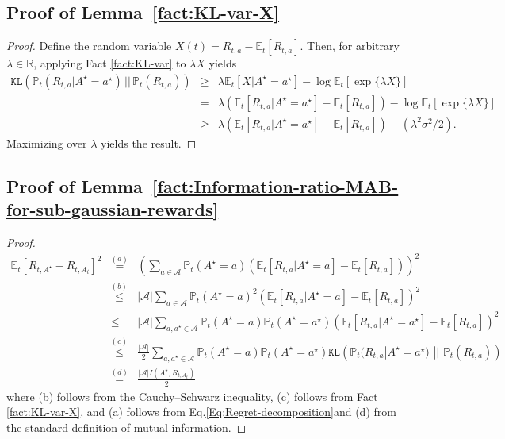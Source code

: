 \documentclass[10pt]{article}
\def\KL{\texttt{KL}}
\def\E{\mathbb{E}}
\newcommand{\A}{\mathcal{A}}
\newcommand{\Prob}{\mathbb{P}}
\begin{document}
\subsection{Proof of Lemma~\ref{fact:KL-var-X}}

\begin{proof}
Define the random variable $X(t)=R_{t,a}- \E_{t}\left[ R_{t,a}\right]$. Then, for arbitrary $\lambda \in \mathbb{R}$, applying Fact \ref{fact:KL-var} to $\lambda X$ yields
\begin{eqnarray*}
\KL \left(\Prob_{t}\left( R_{t,a}  | A^\star=a^\star \right) \, || \, \Prob_{t}( R_{t,a})\right) &\geq& \lambda \E_{t}\left[X | A^\star=a^\star \right] - \log \E_{t} \left[ \exp\{\lambda X \} \right]\\
&= & \lambda \left( \E_{t}[R_{t,a}| A^\star=a^\star]- \E_{t}\left[ R_{t,a}\right] \right)- \log \E_{t} \left[ \exp\{\lambda X \}\right] \\
&\geq&\lambda \left( \E_{t}[R_{t,a}| A^\star=a^\star]- \E_{t}\left[ R_{t,a}\right] \right) - (\lambda^2 \sigma^2 /2).
\end{eqnarray*}
Maximizing over $\lambda$ yields the result. 
\end{proof}

\subsection{Proof of Lemma~\ref{fact:Information-ratio-MAB-for-sub-gaussian-rewards}}

\begin{proof}   
\begin{eqnarray*}
\E_{t} \left[ R_{t,A^\star} - R_{t,A_{t}}\right]^2 &\overset{(a)}{=}&  \left(\sum_{a\in \A} \Prob_{t}(A^\star=a) \left( \E_{t}\left[R_{t,a} | A^\star=a \right] - \E_{t}[R_{t,a}]\right) \right)^2 \\
&\overset{(b)}{\leq}& |\A|  \sum_{a\in \A} \Prob_{t}(A^\star=a)^2 \left( \E_{t}\left[R_{t,a} | A^\star=a \right] - \E_{t}[ R_{t,a}]\right)^2    \\
&\leq& |\A|  \sum_{a, a^\star \in \A} \Prob_{t}(A^\star=a)\Prob_{t}(A^\star=a^\star) \left( \E_{t}\left[R_{t,a} | A^\star=a^\star \right] - \E_{t}[ R_{t,a}]\right)^2   \\
&\overset{(c)}{\leq}& \frac{|\A|}{2} \sum_{a, a^\star \in \A} \Prob_{t}(A^\star=a)\Prob_{t}(A^\star=a^\star){\KL}\left(\Prob_{t}(R_{t,a} | A^\star = a^\star)   \,\, || \,\, \Prob_{t}(R_{t,a})  \right)  \\
&\overset{(d)}{=}& \frac{|\A| I( A^\star ; R_{t,A_{t}})}{2}
\end{eqnarray*}
where (b) follows from the Cauchy--Schwarz inequality, (c) follows from Fact \ref{fact:KL-var-X}, and (a) follows from Eq.\ref{Eq:Regret-decomposition}and (d) from the standard definition of mutual-information. 
\end{proof}
\end{document}
